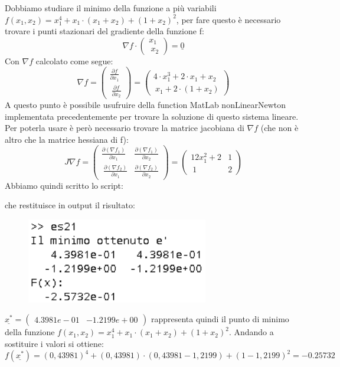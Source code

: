\begin{flushleft}
Dobbiamo studiare il minimo della funzione a più variabili $f(x_1,x_2)=x_1^4+x_1\cdot(x_1+x_2)+(1+x_2)^2$, per fare questo è necessario trovare i punti stazionari del gradiente della funzione f:
\[
\nabla f \cdot \begin{pmatrix} x_1 \\\ x_2 \end{pmatrix} = \underline{0}
\]
Con $\nabla f$ calcolato come segue:
\[
\nabla f = \begin{pmatrix} \frac{\partial f}{\partial x_1} \\\ \frac{\partial f}{\partial x_2} \end{pmatrix} = \begin{pmatrix} 4\cdot x_1^3+2\cdot x_1 + x_2 \\\ x_1+2\cdot(1+x_2)\end{pmatrix}
\]
A questo punto è possibile usufruire della function MatLab nonLinearNewton implementata precedentemente per trovare la soluzione di questo sistema lineare. Per poterla usare è però necessario trovare la matrice jacobiana di $\nabla f$ (che non è altro che la matrice hessiana di f):
\[
J\nabla f = \begin{pmatrix} \frac{\partial (\nabla f_1)}{\partial x_1} & \frac{\partial (\nabla f_1)}{\partial x_2}  \\\ \frac{\partial (\nabla f_2)}{\partial x_1} & \frac{\partial (\nabla f_2)}{\partial x_2} \end{pmatrix} = \begin{pmatrix} 12x_1^2+2 & 1  \\\ 1 & 2 \end{pmatrix}
\]
Abbiamo quindi scritto lo script:

che restituisce in output il risultato:
\begin{figure}[H]
\includegraphics[left, width=300px]{cap_3/es21/es321}
\end{figure}
$\underline{x^*} = \begin{pmatrix} 4.3981e-01 & -1.2199e+00 \end{pmatrix}$ rappresenta quindi il punto di minimo della funzione $f(x_1,x_2)=x_1^4+x_1\cdot(x_1+x_2)+(1+x_2)^2$. Andando a sostituire i valori si ottiene:
\[
f(\underline{x^*}) = (0,43981)^4+(0,43981)\cdot(0,43981-1,2199)+(1-1,2199)^2 = -0.25732
\]
\end{flushleft}